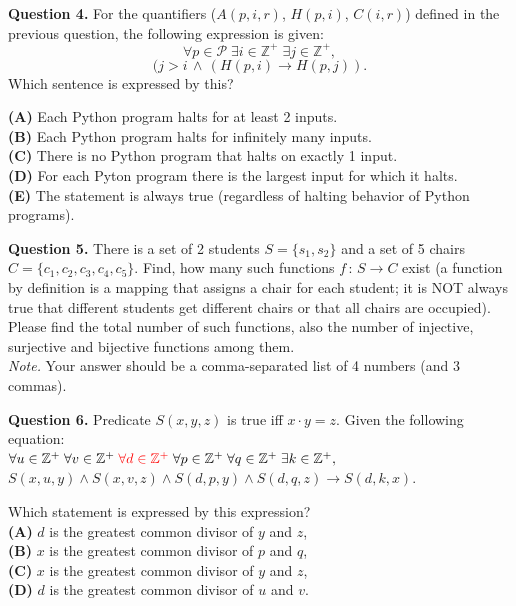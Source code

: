 \documentclass[jou]{apa6}
\begin{document}
\vspace{6pt}
{\bf Question 4.} For the quantifiers 
($A(p,i,r)$, $H(p,i)$, $C(i,r)$) defined in the previous question, 
the following expression is given:
$$\forall p \in \mathcal{P}\;
\exists i \in \mathbb{Z}^{+}\; \exists j \in \mathbb{Z}^{+},$$
$$(j > i \,\wedge\, (H(p,i) \rightarrow H(p,j)).$$
Which sentence is expressed by this?

\noindent
{\bf (A)} Each Python program halts for at least 2 inputs.\\
{\bf (B)} Each Python program halts for infinitely many inputs. \\
{\bf (C)} There is no Python program that halts on exactly 1 input. \\
{\bf (D)} For each Pyton program there is the largest input for which it halts.\\
{\color{red} {\bf (E)} The statement is always true (regardless of halting behavior of Python programs).}

\vspace{6pt}
{\bf Question 5.} 
There is a set of 2 students $S = \{ s_1, s_2 \}$ and 
a set of 5 chairs $C = \{ c_1, c_2, c_3, c_4, c_5 \}$. 
Find, how many such functions $f\,:\,S \rightarrow C$ exist (a function 
by definition is a mapping that assigns a chair for each student;
it is NOT always true that different students get different chairs
or that all chairs are occupied). Please find the total number of 
such functions, also the number of injective, surjective
and bijective functions among them.\\
{\em Note.} Your answer should be a comma-separated list of 
4 numbers (and 3 commas).



\vspace{6pt}
{\bf Question 6.} 
Predicate $S(x,y,z)$ is true iff $x \cdot y=z$.
Given the following equation:\\[3pt]
$\forall u \in \mathbb{Z}^{+}\;\forall v \in \mathbb{Z}^{+}\;
\textcolor{red}{\forall d \in \mathbb{Z}^{+}}\;
\forall p \in \mathbb{Z}^{+}\;\forall q \in \mathbb{Z}^{+}\;
\exists k \in \mathbb{Z}^{+},$\\
$S(x,u,y) \wedge S(x,v,z) \wedge
S(d,p,y) \wedge S(d,q,z) \rightarrow S(d,k,x).$


Which statement is expressed by this expression?\\
{\bf (A)} $d$ is the greatest common divisor of $y$ and $z$,\\
{\bf (B)} $x$ is the greatest common divisor of $p$ and $q$,\\
{\bf (C)} $x$ is the greatest common divisor of $y$ and $z$,\\
{\bf (D)} $d$ is the greatest common divisor of $u$ and $v$.
\end{document}
